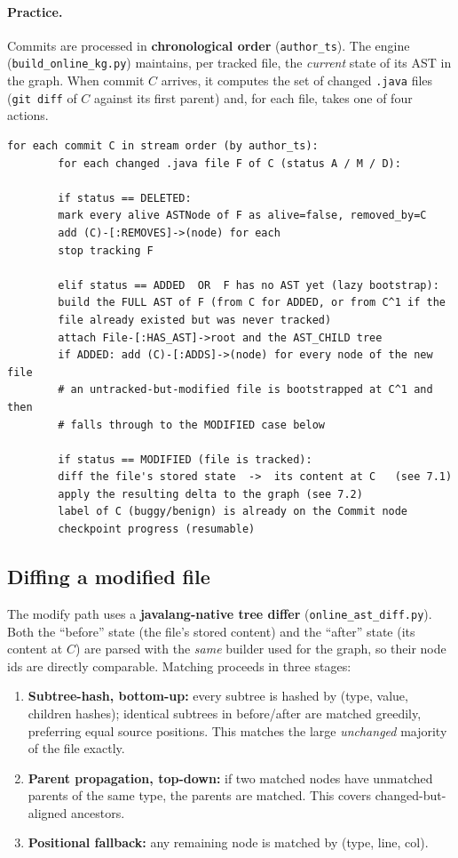 \documentclass[11pt,a4paper]{article}
\newcommand{\code}[1]{\texttt{#1}}
\begin{document}
	\paragraph{Practice.} Commits are processed in \textbf{chronological order}
	(\code{author\_ts}). The engine (\texttt{build\_online\_kg.py}) maintains, per
	tracked file, the \emph{current} state of its AST in the graph. When commit $C$
	arrives, it computes the set of changed \texttt{.java} files (\code{git diff} of
	$C$ against its first parent) and, for each file, takes one of four actions.
	
	\begin{lstlisting}[style=algo,caption={Per-commit processing.}]
		for each commit C in stream order (by author_ts):
		for each changed .java file F of C (status A / M / D):
		
		if status == DELETED:
		mark every alive ASTNode of F as alive=false, removed_by=C
		add (C)-[:REMOVES]->(node) for each
		stop tracking F
		
		elif status == ADDED  OR  F has no AST yet (lazy bootstrap):
		build the FULL AST of F (from C for ADDED, or from C^1 if the
		file already existed but was never tracked)
		attach File-[:HAS_AST]->root and the AST_CHILD tree
		if ADDED: add (C)-[:ADDS]->(node) for every node of the new file
		# an untracked-but-modified file is bootstrapped at C^1 and then
		# falls through to the MODIFIED case below
		
		if status == MODIFIED (file is tracked):
		diff the file's stored state  ->  its content at C   (see 7.1)
		apply the resulting delta to the graph (see 7.2)
		label of C (buggy/benign) is already on the Commit node
		checkpoint progress (resumable)
	\end{lstlisting}
	
	\subsection{Diffing a modified file}
	The modify path uses a \textbf{javalang-native tree differ}
	(\texttt{online\_ast\_diff.py}). Both the ``before'' state (the file's stored
	content) and the ``after'' state (its content at $C$) are parsed with the
	\emph{same} builder used for the graph, so their node ids are directly
	comparable. Matching proceeds in three stages:
	
	\begin{enumerate}[nosep]
		\item \textbf{Subtree-hash, bottom-up:} every subtree is hashed by
		(type, value, children hashes); identical subtrees in before/after are
		matched greedily, preferring equal source positions. This matches the
		large \emph{unchanged} majority of the file exactly.
		\item \textbf{Parent propagation, top-down:} if two matched nodes have
		unmatched parents of the same type, the parents are matched. This covers
		changed-but-aligned ancestors.
		\item \textbf{Positional fallback:} any remaining node is matched by
		(type, line, col).
	\end{enumerate}
	
\end{document}
